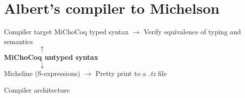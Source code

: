 \documentclass[aspectratio=169]{beamer}
\begin{document}
\section{Albert's compiler to Michelson}

\begin{frame}{Compiler target}
  MiChoCoq typed syntax $\rightarrow$ Verify equivalence of typing and semantics \\
  $\mspace{90mu} \uparrow $ \\
  \textbf{MiChoCoq untyped syntax} \\
  $\mspace{90mu} \downarrow $ \\
  Micheline (S-expressions) $\rightarrow$ Pretty print to a \textit{.tz} file
\end{frame}

\begin{frame}{Compiler architecture}
\end{frame}
\end{document}
